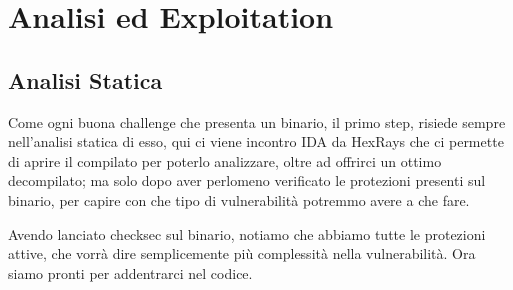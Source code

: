 \documentclass[main.tex]{subfiles}
\begin{document}
\section{Analisi ed Exploitation}\label{sec:exploiting}


\subsection{Analisi Statica}

\hspace*{0.25in}Come ogni buona challenge che presenta un binario, il primo step, risiede sempre nell'analisi statica di esso, qui ci viene incontro IDA da HexRays che ci permette di aprire il compilato per poterlo analizzare, oltre ad offrirci un ottimo decompilato; ma solo dopo aver perlomeno verificato le protezioni presenti sul binario, per capire con che tipo di vulnerabilità potremmo avere a che fare.
\begin{figure}[h]
    \centering
    \captionsetup{aboveskip=0pt}
\end{figure}

Avendo lanciato checksec sul binario, notiamo che abbiamo tutte le protezioni attive, che vorrà dire semplicemente più complessità nella vulnerabilità.
Ora siamo pronti per addentrarci nel codice.
\begin{figure}[h]
    \centering
    \captionsetup{aboveskip=0pt}
\end{figure}
\end{document}
